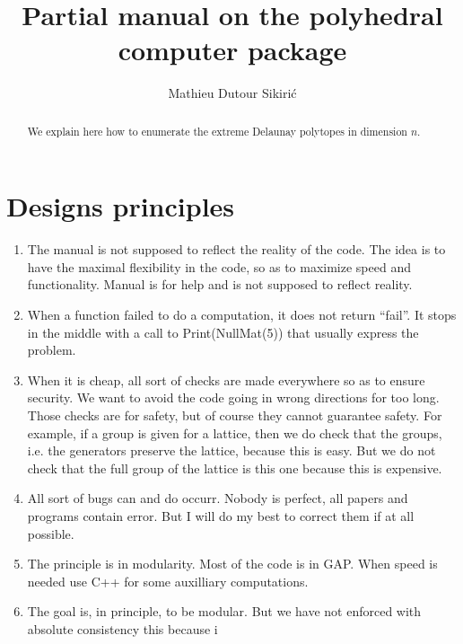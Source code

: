 \documentclass[12pt]{amsart}
\begin{document}
\author{Mathieu Dutour Sikiri\'c}
\address{Mathieu Dutour Sikiri\'c, Rudjer Boskovi\'c Institute, Bijenicka 54, 10000 Zagreb, Croatia, Fax: +385-1-468-0245}





\title{Partial manual on the polyhedral computer package}


\maketitle

\begin{abstract}
We explain here how to enumerate the extreme Delaunay polytopes
in dimension $n$.
\end{abstract}

\section{Designs principles}

\begin{enumerate}
\item The manual is not supposed to reflect the reality of the code.
The idea is to have the maximal flexibility in the code, so as to maximize
speed and functionality. Manual is for help and is not supposed to reflect
reality.
\item When a function failed to do a computation, it does not return ``fail''.
It stops in the middle with a call to {\rm Print(NullMat(5))} that usually
express the problem.
\item When it is cheap, all sort of checks are made everywhere so as to
ensure security. We want to avoid the code going in wrong directions for
too long. Those checks are for safety, but of course they cannot guarantee
safety. For example, if a group is given for a lattice, then we do check that
the groups, i.e. the generators preserve the lattice, because this is easy.
But we do not check that the full group of the lattice is this one because
this is expensive.
\item All sort of bugs can and do occurr. Nobody is perfect, all papers
and programs contain error. But I will do my best to correct them if at
all possible.
\item The principle is in modularity. Most of the code is in GAP.
When speed is needed use C++ for some auxilliary computations.
\item The goal is, in principle, to be modular. But we have not enforced
with absolute consistency this because i




\end{enumerate}
\end{document}
